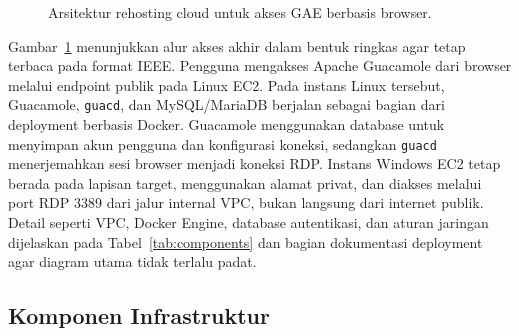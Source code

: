 \documentclass[conference]{IEEEtran}
\begin{document}
\begin{figure}[t]
\centering
{}
\caption{Arsitektur rehosting cloud untuk akses GAE berbasis browser.}
\label{fig:architecture}
\end{figure}

Gambar~\ref{fig:architecture} menunjukkan alur akses akhir dalam bentuk ringkas agar tetap terbaca pada format IEEE. Pengguna mengakses Apache Guacamole dari browser melalui endpoint publik pada Linux EC2. Pada instans Linux tersebut, Guacamole, \texttt{guacd}, dan MySQL/MariaDB berjalan sebagai bagian dari deployment berbasis Docker. Guacamole menggunakan database untuk menyimpan akun pengguna dan konfigurasi koneksi, sedangkan \texttt{guacd} menerjemahkan sesi browser menjadi koneksi RDP. Instans Windows EC2 tetap berada pada lapisan target, menggunakan alamat privat, dan diakses melalui port RDP 3389 dari jalur internal VPC, bukan langsung dari internet publik. Detail seperti VPC, Docker Engine, database autentikasi, dan aturan jaringan dijelaskan pada Tabel~\ref{tab:components} dan bagian dokumentasi deployment agar diagram utama tidak terlalu padat.

\subsection{Komponen Infrastruktur}
\end{document}

